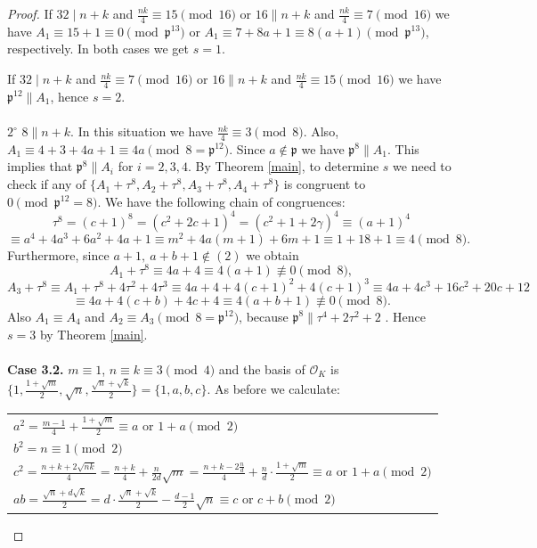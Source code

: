 \documentclass[10pt,a4paper]{amsart}
\newcommand{\p}{\mathfrak{p}}
\begin{document}
\begin{proof}
If $32 \mid n+k$ and $\frac{nk}{4} \equiv 15 \pmod{16}$ or $16 \parallel n+k$ and $\frac{nk}{4} \equiv 7 \pmod{16}$ we have $A_1 \equiv 15 + 1 \equiv 0 \pmod{\p^{13}}$ or $A_1 \equiv 7 + 8a + 1 \equiv 8(a+1) \pmod{\p^{13}}$, respectively. In both cases we get $s=1$. 

If $32 \mid n+k$ and $\frac{nk}{4} \equiv 7 \pmod{16}$ or $16 \parallel n+k$ and $\frac{nk}{4} \equiv 15 \pmod{16}$ we have $\mathfrak{p}^{12} \parallel A_1$, hence $s=2$.
\\ \\
$2^{\circ}$ $8 \parallel n+k$. In this situation we have $\frac{nk}{4} \equiv 3 \pmod{8}$. Also, $A_1 \equiv 4 + 3 + 4a + 1 \equiv 4a \pmod{8 = \mathfrak{p}^{12}}$. Since $a \not\in \mathfrak{p}$ we have $\mathfrak{p}^8 \parallel A_1$. This implies that $\mathfrak{p}^8 \parallel A_i$ for $i=2,3,4$. By Theorem \ref{main}, to determine $s$ we need to check if any of $\{A_1+\tau^8, A_2+\tau^8, A_3+\tau^8, A_4+\tau^8\}$ is congruent to $0 \pmod{\mathfrak{p}^{12} = 8}$. We have the following chain of congruences:
\[ \tau^8 = (c+1)^8 = (c^2+2c+1)^4 = (c^2+1  + 2\gamma)^4  \equiv (a+1)^4 \]
\[  \equiv a^4 + 4a^3+6a^2+4a+1 \equiv m^2 + 4a(m+1) + 6m + 1 \equiv 1 + 18 + 1 \equiv 4 \pmod{8}. \]
Furthermore, since $a+1, \  a+b+1 \not\in (2)$ we obtain
\[ A_1 + \tau^8 \equiv 4a + 4 \equiv 4(a+1) \not\equiv 0 \pmod{8 },\]
\[A_3 + \tau^8 \equiv A_1 + \tau^8 + 4\tau^2+4\tau^3 \equiv 4a + 4 + 4(c+1)^2 + 4(c+1)^3 \equiv 4a + 4c^3 + 16c^2 + 20c + 12\]  \[\equiv 4a + 4(c+b) + 4c + 4 \equiv 4(a+b+1) \not\equiv 0 \pmod{8 }.\]
Also $A_1 \equiv A_4$ and $A_2 \equiv A_3 \pmod{8 = \mathfrak{p}^{12} }$, because $\mathfrak{p}^8 \parallel \tau^4+2\tau^2+2$ . Hence $s=3$ by Theorem \ref{main}.
\\ \\
\textbf{Case 3.2.} $m \equiv 1$, $n \equiv k \equiv 3 \pmod{4}$ and the basis of $\mathcal{O}_K$ is $\{1, \frac{1+\sqrt{m}}{2}, \sqrt{n}, \frac{\sqrt{n}+\sqrt{k}}{2}\} = \{1,a,b,c\}$. As before we calculate:
\begin{center}
\begin{tabular}{@{}l@{}}
$a^2 = \frac{m-1}{4} + \frac{1+\sqrt{m}}{2} \equiv a \text{ or } 1 + a \pmod{2}$ \\
$b^2 = n \equiv 1 \pmod{2}$\\
$c^2 = \frac{n+k+2\sqrt{nk}}{4} = \frac{n+k}{4} + \frac{n}{2d}\sqrt{m} = \frac{n+k-2\frac{n}{d}}{4} + \frac{n}{d} \cdot \frac{1+\sqrt{m}}{2} \equiv a \text{ or } 1+a \pmod{2}$\\
$ab = \frac{\sqrt{n} + d\sqrt{k}}{2} = d \cdot \frac{\sqrt{n}+\sqrt{k}}{2} - \frac{d-1}{2} \sqrt{n} \equiv c \text{ or } c + b \pmod{2} $\\

\end{tabular}
\end{center}
\end{proof}
\end{document}
